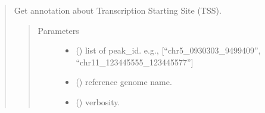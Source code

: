\documentclass[letterpaper,10pt,english]{sphinxmanual}
\begin{document}
\begin{quote}
\begin{fulllineitems}
\begin{fulllineitems}
\end{fulllineitems}


\end{fulllineitems}


\begin{fulllineitems}
\label{\detokenize{modules/celloracle.motif_analysis:celloracle.motif_analysis.get_tss_info}}
Get annotation about Transcription Starting Site (TSS).
\begin{quote}\begin{description}
\item[{Parameters}] \leavevmode\begin{itemize}
\item {} 
 () \textendash{} list of peak\_id. e.g., {[}“chr5\_0930303\_9499409”, “chr11\_123445555\_123445577”{]}

\item {} 
 () \textendash{} reference genome name.

\item {} 
 () \textendash{} verbosity.

\end{itemize}

\end{description}\end{quote}

\end{fulllineitems}



\end{quote}
\end{document}
